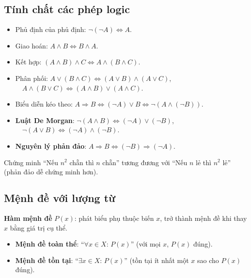 \documentclass[12pt,a4paper]{article}
\begin{document}
\subsection{Tính chất các phép logic}

\begin{tinhchat}
  \begin{itemize}
    \item Phủ định của phủ định: $\neg(\neg A) \Leftrightarrow A$.
    \item Giao hoán: $A \wedge B \Leftrightarrow B \wedge A$.
    \item Kết hợp: $(A \wedge B) \wedge C \Leftrightarrow A \wedge (B \wedge C)$.
    \item Phân phối: $A \vee (B \wedge C) \Leftrightarrow (A \vee B) \wedge (A \vee C)$, $\quad A \wedge (B \vee C) \Leftrightarrow (A \wedge B) \vee (A \wedge C)$.
    \item Biểu diễn kéo theo: $A \Rightarrow B \Leftrightarrow (\neg A) \vee B \Leftrightarrow \neg(A \wedge (\neg B))$.
    \item \textbf{Luật De Morgan}: $\neg(A \wedge B) \Leftrightarrow (\neg A) \vee (\neg B)$, $\quad \neg(A \vee B) \Leftrightarrow (\neg A) \wedge (\neg B)$.
    \item \textbf{Nguyên lý phản đảo}: $A \Rightarrow B \Leftrightarrow (\neg B) \Rightarrow (\neg A)$.
  \end{itemize}
\end{tinhchat}

\begin{vidu}
  Chứng minh ``Nếu $n^2$ chẵn thì $n$ chẵn'' tương đương với ``Nếu $n$ lẻ thì $n^2$ lẻ'' (phản đảo dễ chứng minh hơn).
\end{vidu}

\subsection{Mệnh đề với lượng từ}

\begin{dinhnghia}
  \textbf{Hàm mệnh đề} $P(x)$: phát biểu phụ thuộc biến $x$, trở thành mệnh đề khi thay $x$ bằng giá trị cụ thể.
\end{dinhnghia}

\begin{dinhnghia}
  \begin{itemize}
    \item \textbf{Mệnh đề toàn thể}: ``$\forall x \in X$: $P(x)$'' (với mọi $x$, $P(x)$ đúng).
    \item \textbf{Mệnh đề tồn tại}: ``$\exists x \in X$: $P(x)$'' (tồn tại ít nhất một $x$ sao cho $P(x)$ đúng).
  \end{itemize}
\end{dinhnghia}
\end{document}
